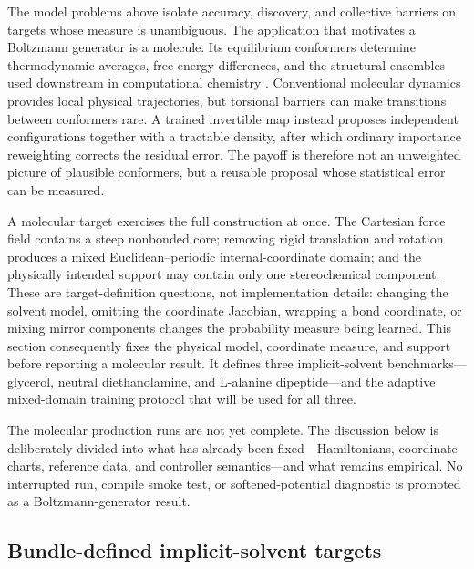 \documentclass{article}
\begin{document}
The model problems above isolate accuracy, discovery, and collective barriers on targets whose measure is unambiguous. The application that motivates a Boltzmann generator is a molecule. Its equilibrium conformers determine thermodynamic averages, free-energy differences, and the structural ensembles used downstream in computational chemistry \citep{noe2019boltzmann}. Conventional molecular dynamics provides local physical trajectories, but torsional barriers can make transitions between conformers rare. A trained invertible map instead proposes independent configurations together with a tractable density, after which ordinary importance reweighting corrects the residual error. The payoff is therefore not an unweighted picture of plausible conformers, but a reusable proposal whose statistical error can be measured.

A molecular target exercises the full construction at once. The Cartesian force field contains a steep nonbonded core; removing rigid translation and rotation produces a mixed Euclidean--periodic internal-coordinate domain; and the physically intended support may contain only one stereochemical component. These are target-definition questions, not implementation details: changing the solvent model, omitting the coordinate Jacobian, wrapping a bond coordinate, or mixing mirror components changes the probability measure being learned. This section consequently fixes the physical model, coordinate measure, and support before reporting a molecular result. It defines three implicit-solvent benchmarks---glycerol, neutral diethanolamine, and L-alanine dipeptide---and the adaptive mixed-domain training protocol that will be used for all three.

The molecular production runs are not yet complete. The discussion below is deliberately divided into what has already been fixed---Hamiltonians, coordinate charts, reference data, and controller semantics---and what remains empirical. No interrupted run, compile smoke test, or softened-potential diagnostic is promoted as a Boltzmann-generator result.

\subsection{Bundle-defined implicit-solvent targets}
\label{sec: mol-background}
\end{document}
